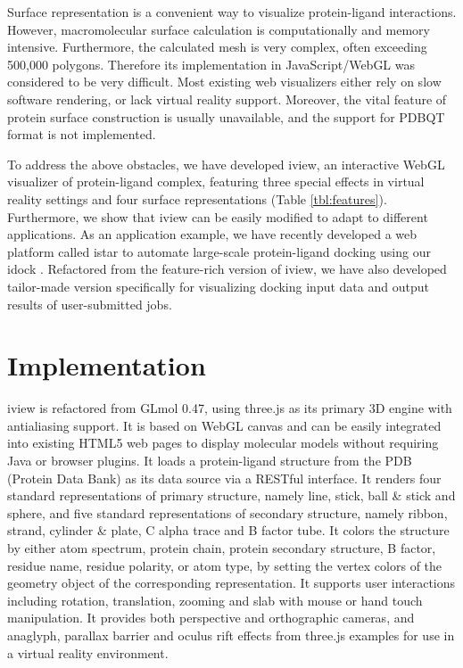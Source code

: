 \documentclass[twocolumn]{bmcart}%
\begin{document}
Surface representation is a convenient way to visualize protein-ligand interactions. However, macromolecular surface calculation is computationally and memory intensive. Furthermore, the calculated mesh is very complex, often exceeding 500,000 polygons. Therefore its implementation in JavaScript/WebGL was considered to be very difficult. Most existing web visualizers either rely on slow software rendering, or lack virtual reality support. Moreover, the vital feature of protein surface construction is usually unavailable, and the support for PDBQT format is not implemented.

To address the above obstacles, we have developed iview, an interactive WebGL visualizer of protein-ligand complex, featuring three special effects in virtual reality settings and four surface representations (Table \ref{tbl:features}). Furthermore, we show that iview can be easily modified to adapt to different applications. As an application example, we have recently developed a web platform called istar \cite{1362} to automate large-scale protein-ligand docking using our idock \cite{1153}. Refactored from the feature-rich version of iview, we have also developed tailor-made version specifically for visualizing docking input data and output results of user-submitted jobs.

\section*{Implementation}
iview is refactored from GLmol 0.47, using three.js as its primary 3D engine with antialiasing support. It is based on WebGL canvas and can be easily integrated into existing HTML5 web pages to display molecular models without requiring Java or browser plugins. It loads a protein-ligand structure from the PDB (Protein Data Bank) \cite{1357} as its data source via a RESTful interface. It renders four standard representations of primary structure, namely line, stick, ball \& stick and sphere, and five standard representations of secondary structure, namely ribbon, strand, cylinder \& plate, C alpha trace and B factor tube. It colors the structure by either atom spectrum, protein chain, protein secondary structure, B factor, residue name, residue polarity, or atom type, by setting the vertex colors of the geometry object of the corresponding representation. It supports user interactions including rotation, translation, zooming and slab with mouse or hand touch manipulation. It provides both perspective and orthographic cameras, and anaglyph, parallax barrier and oculus rift effects from three.js examples for use in a virtual reality environment.
\end{document}
